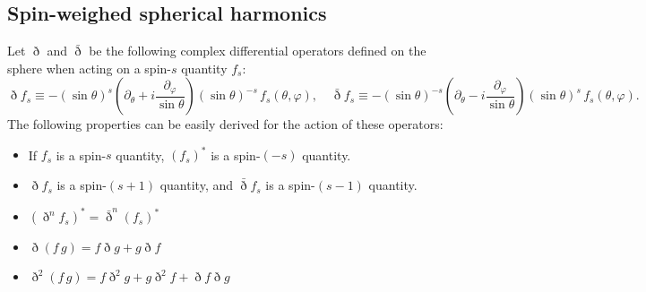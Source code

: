 \documentclass[a4paper,10pt]{article}
\begin{document}
\subsection{Spin-weighed spherical harmonics}
  Let $\eth$ and $\bar{\eth}$ be the following complex differential operators defined on the sphere when acting on a spin-$s$ quantity $f_s$:
  \begin{equation}
    \eth f_s\equiv-(\sin\theta)^s\left(\partial_\theta+i\frac{\partial_\varphi}{\sin\theta}\right)(\sin\theta)^{-s}\,f_s(\theta,\varphi),\hspace{12pt}
    \bar{\eth} f_s\equiv-(\sin\theta)^{-s}\left(\partial_\theta-i\frac{\partial_\varphi}{\sin\theta}\right)(\sin\theta)^{s}\,f_s(\theta,\varphi).
  \end{equation}
  The following properties can be easily derived for the action of these operators:
  \begin{itemize}
    \item If $f_s$ is a spin-$s$ quantity, $(f_s)^*$ is a spin-$(-s)$ quantity.
    \item $\eth f_s$ is a spin-$(s+1)$ quantity, and $\bar{\eth} f_s$ is a spin-$(s-1)$ quantity.
    \item $(\eth^nf_s)^*=\bar{\eth}^n(f_s)^*$
    \item $\eth(f\,g)=f\eth g+g\eth f$
    \item $\eth^2(f\,g)=f\eth^2g+g\eth^2f+\eth f\eth g$
  \end{itemize}
  
\end{document}
